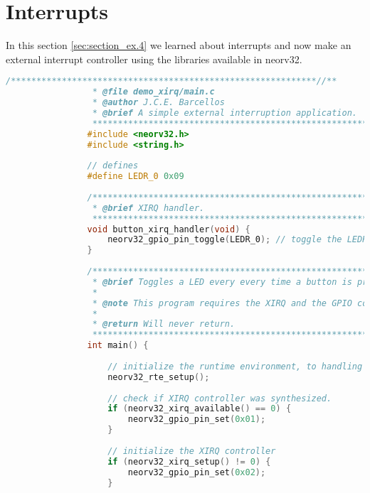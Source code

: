     \section{Interrupts} \label{sec:section_ex.4}
    
        In this section \autoref{sec:section_ex.4} we learned about interrupts and now make an external interrupt controller using the libraries available in neorv32.

            \begin{lstlisting}[style=mystyle_c, language=c, breaklines]
                /************************************************************//**
                 * @file demo_xirq/main.c
                 * @author J.C.E. Barcellos
                 * @brief A simple external interruption application.
                 ***************************************************************/
                #include <neorv32.h>
                #include <string.h>
                
                // defines
                #define LEDR_0 0x09
                
                /************************************************************//**
                 * @brief XIRQ handler.
                 ***************************************************************/
                void button_xirq_handler(void) {
                    neorv32_gpio_pin_toggle(LEDR_0); // toggle the LEDR[0]
                }
                
                /************************************************************//**
                 * @brief Toggles a LED every every time a button is pressed.
                 *
                 * @note This program requires the XIRQ and the GPIO controller to be synthesized.
                 *
                 * @return Will never return.
                 ***************************************************************/
                int main() {
                
                    // initialize the runtime environment, to handling all CPU's traps
                    neorv32_rte_setup();
                
                    // check if XIRQ controller was synthesized.
                    if (neorv32_xirq_available() == 0) {
                        neorv32_gpio_pin_set(0x01);
                    }
                
                    // initialize the XIRQ controller
                    if (neorv32_xirq_setup() != 0) {
                        neorv32_gpio_pin_set(0x02);
                    }
                

\end{lstlisting}
